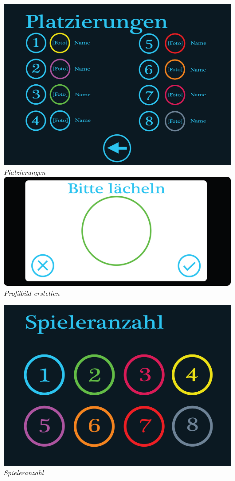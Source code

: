 \begin{flushright}
\includegraphics[width=0.9\textwidth]{img/platzierungen.png}\\
\textit{Platzierungen}\\[4em]

\includegraphics[width=0.9\textwidth]{img/profilbild_erstellen.png}\\
\textit{Profilbild erstellen}

\includegraphics[width=0.9\textwidth]{img/spieleranzahl.png}\\
\textit{Spieleranzahl}\\[1em]


\end{flushright}
